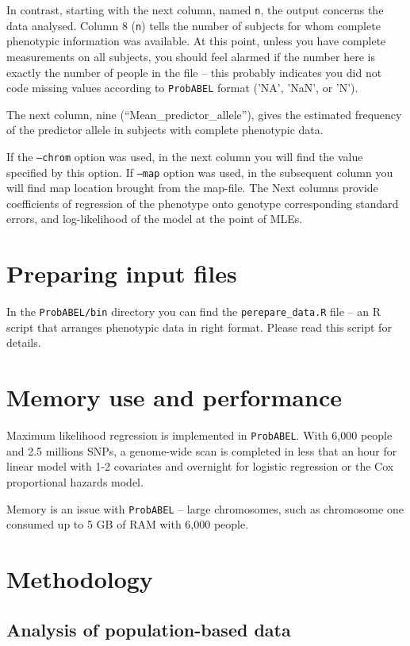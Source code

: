 \documentclass[12pt,a4paper]{article}
\begin{document}
In contrast, starting with the next column, named \texttt{n}, 
the output concerns the data analysed. Column 8 (\texttt{n}) tells the 
number of subjects for whom complete phenotypic information was available. 
At this point, unless you have complete measurements on all 
subjects, you should feel alarmed if the number here is exactly the 
number of people in the file -- this probably indicates you did not code 
missing values according to \texttt{ProbABEL} format ('NA', 'NaN', or 'N').

The next column, nine (``Mean\_predictor\_allele''), gives the estimated 
frequency of the predictor allele in subjects with complete phenotypic data. 

If the \texttt{--chrom} option was used, in the next column you will find the 
value specified by this option. If \texttt{--map} option was used, in the
subsequent column you will find map location brought from the
map-file. The Next columns provide coefficients of regression  of the phenotype 
onto genotype corresponding standard errors, and log-likelihood %
of the model at the point of MLEs.

\section{Preparing input files}
In the \texttt{ProbABEL/bin} directory you can find the
\texttt{perepare\_data.R} file -- an R script that arranges phenotypic
data in right format. Please read this script for details.

\section{Memory use and performance}
Maximum likelihood regression is implemented in \texttt{ProbABEL}. With 6,000 
people and 2.5 millions SNPs, a genome-wide scan is completed in less 
that an hour for linear model with 1-2 covariates and overnight 
for logistic regression or the Cox proportional hazards model.

Memory is an issue with \texttt{ProbABEL} -- large chromosomes, 
such as chromosome one consumed up to 5 GB of RAM with 6,000 people. 

\section{Methodology}
\subsection{Analysis of population-based data}
\end{document}
